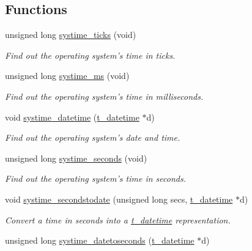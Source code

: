\subsection*{Functions}
\begin{DoxyCompactItemize}
\item 
unsigned long \hyperlink{group__systime_gaa7831fc0634782a0ba07b44f47be8e61}{systime\_\-ticks} (void)
\begin{DoxyCompactList}\small\item\em Find out the operating system’s time in ticks. \item\end{DoxyCompactList}\item 
unsigned long \hyperlink{group__systime_ga9f23c7624ff113b985a34797bbf2f728}{systime\_\-ms} (void)
\begin{DoxyCompactList}\small\item\em Find out the operating system’s time in milliseconds. \item\end{DoxyCompactList}\item 
void \hyperlink{group__systime_ga53bc85cf0868e8712f32ee846642ab83}{systime\_\-datetime} (\hyperlink{structt__datetime}{t\_\-datetime} $\ast$d)
\begin{DoxyCompactList}\small\item\em Find out the operating system’s date and time. \item\end{DoxyCompactList}\item 
unsigned long \hyperlink{group__systime_ga8517f74817ccaaca5eb4bd4e82823bf5}{systime\_\-seconds} (void)
\begin{DoxyCompactList}\small\item\em Find out the operating system’s time in seconds. \item\end{DoxyCompactList}\item 
void \hyperlink{group__systime_gac7e909e02efabd823ce226a3234d700b}{systime\_\-secondstodate} (unsigned long secs, \hyperlink{structt__datetime}{t\_\-datetime} $\ast$d)
\begin{DoxyCompactList}\small\item\em Convert a time in seconds into a \hyperlink{structt__datetime}{t\_\-datetime} representation. \item\end{DoxyCompactList}\item 
unsigned long \hyperlink{group__systime_gab102340f92f3b8136629cf88a57e61a0}{systime\_\-datetoseconds} (\hyperlink{structt__datetime}{t\_\-datetime} $\ast$d)

\end{DoxyCompactItemize}
